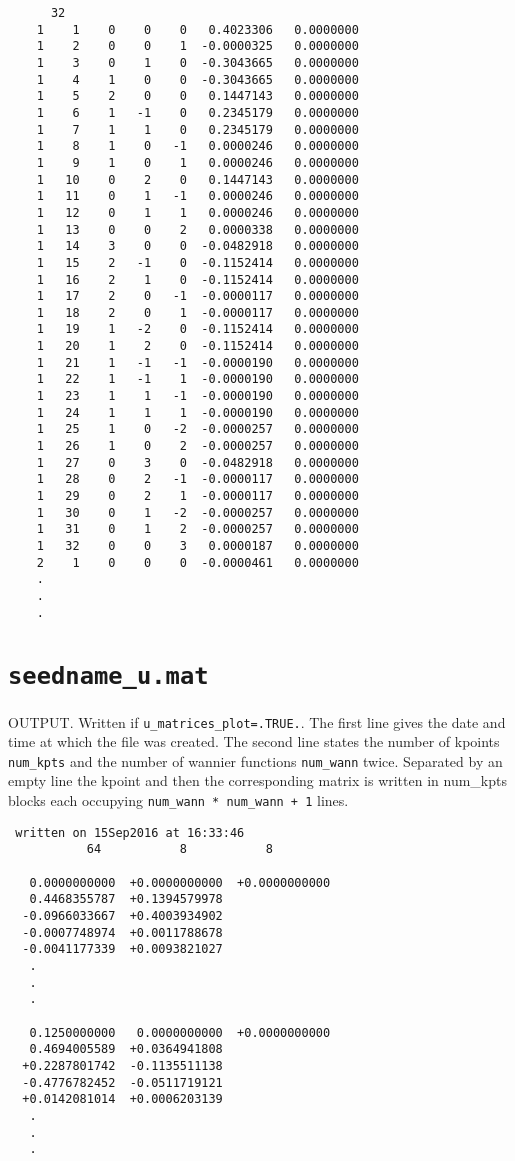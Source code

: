 \begin{verbatim}
      32
    1    1    0    0    0   0.4023306   0.0000000
    1    2    0    0    1  -0.0000325   0.0000000
    1    3    0    1    0  -0.3043665   0.0000000
    1    4    1    0    0  -0.3043665   0.0000000
    1    5    2    0    0   0.1447143   0.0000000
    1    6    1   -1    0   0.2345179   0.0000000
    1    7    1    1    0   0.2345179   0.0000000
    1    8    1    0   -1   0.0000246   0.0000000
    1    9    1    0    1   0.0000246   0.0000000
    1   10    0    2    0   0.1447143   0.0000000
    1   11    0    1   -1   0.0000246   0.0000000
    1   12    0    1    1   0.0000246   0.0000000
    1   13    0    0    2   0.0000338   0.0000000
    1   14    3    0    0  -0.0482918   0.0000000
    1   15    2   -1    0  -0.1152414   0.0000000
    1   16    2    1    0  -0.1152414   0.0000000
    1   17    2    0   -1  -0.0000117   0.0000000
    1   18    2    0    1  -0.0000117   0.0000000
    1   19    1   -2    0  -0.1152414   0.0000000
    1   20    1    2    0  -0.1152414   0.0000000
    1   21    1   -1   -1  -0.0000190   0.0000000
    1   22    1   -1    1  -0.0000190   0.0000000
    1   23    1    1   -1  -0.0000190   0.0000000
    1   24    1    1    1  -0.0000190   0.0000000
    1   25    1    0   -2  -0.0000257   0.0000000
    1   26    1    0    2  -0.0000257   0.0000000
    1   27    0    3    0  -0.0482918   0.0000000
    1   28    0    2   -1  -0.0000117   0.0000000
    1   29    0    2    1  -0.0000117   0.0000000
    1   30    0    1   -2  -0.0000257   0.0000000
    1   31    0    1    2  -0.0000257   0.0000000
    1   32    0    0    3   0.0000187   0.0000000
    2    1    0    0    0  -0.0000461   0.0000000
    .
    .
    .
\end{verbatim}


\section{{\tt seedname\_u.mat}}

OUTPUT. Written if {\tt u\_matrices\_plot=.TRUE.}. The first line gives the date and
time at which the file was created.
The second line states the number of kpoints {\tt num\_kpts} and the number of wannier
functions {\tt num\_wann} twice.
Separated by an empty line the kpoint and then the corresponding matrix is written
in num\_kpts blocks each occupying {\tt num\_wann * num\_wann + 1} lines.

\begin{verbatim}
 written on 15Sep2016 at 16:33:46 
           64           8           8
	 
   0.0000000000  +0.0000000000  +0.0000000000
   0.4468355787  +0.1394579978
  -0.0966033667  +0.4003934902
  -0.0007748974  +0.0011788678
  -0.0041177339  +0.0093821027
   .
   .
   .

   0.1250000000   0.0000000000  +0.0000000000
   0.4694005589  +0.0364941808
  +0.2287801742  -0.1135511138
  -0.4776782452  -0.0511719121
  +0.0142081014  +0.0006203139
   .
   .
   .
\end{verbatim}


